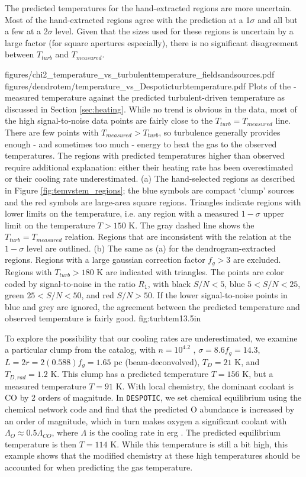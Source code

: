 The predicted temperatures for the hand-extracted regions are more uncertain.
Most of the hand-extracted regions agree with the prediction at a 1$\sigma$ and
all but a few at a 2$\sigma$ level.  Given that the sizes used for these
regions is uncertain by a large factor (for square apertures especially), there
is no significant disagreement between $T_{turb}$ and $T_{measured}$.


\FigureTwo
{figures/chi2_temperature_vs_turbulenttemperature_fieldsandsources.pdf}
{figures/dendrotem/temperature_vs_Despoticturbtemperature.pdf} %
{Plots of the \formaldehyde-measured temperature against the predicted
turbulent-driven temperature as discussed in Section \ref{sec:heating}.
While no trend is obvious in the data, most of the high signal-to-noise
data points are fairly close to the  $T_{turb} = T_{measured}$ line.
There are few points with $T_{measured} > T_{turb}$, so turbulence generally provides
enough - and sometimes too much - energy to heat the gas to the observed temperatures.
The regions with predicted temperatures higher than observed require additional
explanation: either their heating rate has been overestimated or their cooling
rate underestimated.
(a) The hand-selected regions as described in Figure
\ref{fig:temvstem_regions}; the blue symbols are compact `clump' sources and
the red symbols are large-area square regions. 
Triangles indicate regions with lower limits on
the temperature, i.e. any region with
a measured $1-\sigma$ upper limit on the temperature $T>150$ K.  The gray
dashed line shows the $T_{turb} = T_{measured}$ relation.  Regions that are inconsistent
with the relation at the $1-\sigma$ level are outlined.
(b) The same as (a) for the dendrogram-extracted regions.  Regions with a large
gaussian correction factor $f_g>3$ are excluded.  Regions with $T_{turb}>180$ K
are indicated with triangles.
The points are color coded by signal-to-noise in the ratio $R_1$, with black
$S/N < 5$, blue $5 < S/N < 25$, green $25 < S/N < 50$, and red $S/N > 50$. 
If the lower signal-to-noise points in blue and grey are ignored, the agreement
between the predicted temperature and observed temperature is fairly good.
}
{fig:turbtem}{1}{3.5in}

To explore the possibility that our cooling rates are underestimated, we examine
a particular clump from the catalog, with $n=10^{4.2}$ \percc, $\sigma=8.6
f_g = 14.3$\kms, $L = 2r = 2(0.588)f_g = 1.65$ pc (beam-deconvolved), $T_D=21$ K,
and $T_{D,rad} = 1.2$ K.  This clump has a predicted temperature $T=156$ K,
but a measured temperature $T=91$ K.  With local chemistry, the dominant
coolant is CO by 2 orders of magnitude.  In \texttt{DESPOTIC}, we set chemical
equilibrium using the \citet{Nelson1999a} chemical network code and find that
the predicted O abundance is increased by
an order of magnitude, which in turn makes oxygen a significant coolant with
$\Lambda_{O} \approx 0.5 \Lambda_{CO}$, where $\Lambda$ is the cooling rate
in erg \pers \percc.   The predicted equilibrium temperature
is then $T=114$ K.  While this temperature is still a bit high, this example
shows that the modified chemistry at these high temperatures should be
accounted for when predicting the gas temperature.

